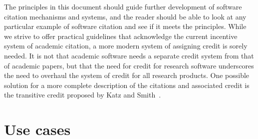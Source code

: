 \documentclass[12pt, oneside]{amsart}
\begin{document}
The principles in this document should guide further development of software citation
mechanisms and systems, and the reader should be able to look at any particular example
of software citation and see if it meets the principles.
While we strive to offer practical guidelines that acknowledge the current
incentive system of academic citation, a more modern system of assigning credit
is sorely needed. It is not that academic software needs a separate credit
system from that of academic papers, but that the need for credit for
research software underscores the need to overhaul the system of credit for
all research products. One possible solution for a more complete description of the
citations and associated credit is the transitive credit proposed by
Katz and Smith~\cite{transitive_credit_original,transitive_credit_json-ld}.

\section{Use cases}
\label{sec:use_cases}
\end{document}
